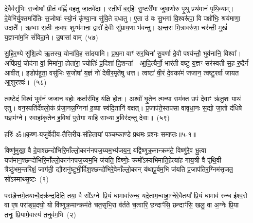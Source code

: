 दे॒वैर्वसु॑भिः स॒जोषाः᳚ प्री॒तं वह्निं॑ वहतु जा॒तवे॑दाः। स्ती॒र्णं ब॒र्॒\mbox{}हिः सु॒ष्टरी॑मा जुषा॒णोरु पृ॒थु प्रथ॑मानं पृथि॒व्याम्। दे॒वेभि॑र्यु॒क्तमदि॑तिः स॒जोषाः᳚ स्यो॒नं कृ॑ण्वा॒ना सु॑वि॒ते द॑धातु। ए॒ता उ॑ वः सु॒भगा॑ वि॒श्वरू॑पा॒ वि पक्षो॑भिः॒ श्रय॑माणा॒ उदातैः᳚। ऋ॒ष्वाः स॒तीः क॒वषः॒ शुम्भ॑माना॒ द्वारो॑ दे॒वीः सु॑प्राय॒णा भ॑वन्तु। अ॒न्त॒रा मि॒त्रावरु॑णा॒ चर॑न्ती॒ मुखं॑ य॒ज्ञाना॑म॒भि सं॑विदा॒ने। उ॒षासा॑ वाम्~(५७)

सु॒हि॒र॒ण्ये सु॑शि॒ल्पे ऋ॒तस्य॒ योना॑वि॒ह सा॑दयामि। प्र॒थ॒मा वाꣳ॑ सर॒थिना॑ सु॒वर्णा॑ दे॒वौ पश्य॑न्तौ॒ भुव॑नानि॒ विश्वा᳚। अपि॑प्रयं॒ चोद॑ना वां॒ मिमा॑ना॒ होता॑रा॒ ज्योतिः॑ प्र॒दिशा॑ दि॒शन्ता᳚। आ॒दि॒त्यैर्नो॒ भार॑ती वष्टु य॒ज्ञꣳ सर॑स्वती स॒ह रु॒द्रैर्न॑ आवीत्। इडोप॑हूता॒ वसु॑भिः स॒जोषा॑ य॒ज्ञं नो॑ देवीर॒मृते॑षु धत्त। त्वष्टा॑ वी॒रं दे॒वका॑मं जजान॒ त्वष्टु॒रर्वा॑ जायत आ॒शुरश्वः॑।~(५८)

त्वष्टे॒दं विश्वं॒ भुव॑नं जजान ब॒होः क॒र्तार॑मि॒ह य॑क्षि होतः। अश्वो॑ घृ॒तेन॒ त्मन्या॒ सम॑क्त॒ उप॑ दे॒वाꣳ ऋ॑तु॒शः पाथ॑ एतु। वन॒स्पति॑र्देवलो॒कं प्र॑जा॒नन्न॒ग्निना॑ ह॒व्या स्व॑दि॒तानि॑ वक्षत्। प्र॒जा\-प॑ते॒स्तप॑सा वावृधा॒नः स॒द्यो जा॒तो द॑धिषे य॒ज्ञम॑ग्ने। स्वाहा॑कृतेन ह॒विषा॑ पुरोगा या॒हि सा॒ध्या ह॒विर॑दन्तु दे॒वाः॥~(५९)

{\anuvakamend[{अ॒ग्निष्ट्वा॑ वा॒मश्वो॒ द्विच॑त्वारिꣳशच्च}]}%

{हरिः॑ ॐ}{॥कृष्ण-यजुर्वेदीय-तैत्तिरीय-संहितायां पञ्चम्काण्डे प्रथमः प्रश्नः समाप्तः॥५-१॥}

\setcounter{anuvakam}{0}
विष्णु॑मुखा॒ वै दे॒वाश्छन्दो॑भिरि॒माँल्लो॒कान॑नपज॒य्यम॒भ्य॑जय॒न्॒ यद्वि॑ष्णुक्र॒मान्क्रम॑ते॒ विष्णु॑रे॒व भू॒त्वा यज॑मान॒श्छन्दो॑भिरि॒माँल्लो॒कान॑नपज॒य्यम॒भि ज॑यति॒ विष्णोः॒ क्रमो᳚\-ऽस्यभिमाति॒हेत्या॑ह गाय॒त्री वै पृ॑थि॒वी त्रैष्ठु॑भम॒न्तरि॑क्षं॒ जाग॑ती॒ द्यौरानु॑ष्टुभी॒र्दिश॒श्छन्दो॑भिरे॒वेमाँल्लो॒कान् य॑थापू॒र्वम॒भि ज॑यति प्र॒जा\-प॑तिर॒ग्निम॑सृजत॒ सो᳚\-ऽस्माथ्सृ॒ष्टः~(१)

परा॑ङै॒त्तमे॒तयान्वै॒दक्र॑न्द॒दिति॒ तया॒ वै सो᳚\-ऽग्नेः प्रि॒यं धामावा॑रुन्ध॒ यदे॒ताम॒न्वाहा॒ग्नेरे॒वैतया᳚ प्रि॒यं धामाव॑ रुन्ध ईश्व॒रो वा ए॒ष परा᳚ङ्प्र॒दघो॒ यो वि॑ष्णुक्र॒मान्क्रम॑ते चत॒सृभि॒रा व॑र्तते च॒त्वारि॒ छन्दाꣳ॑सि॒ छन्दाꣳ॑सि॒ खलु॒ वा अ॒ग्नेः प्रि॒या त॒नूः प्रि॒यामे॒वास्य॑ त॒नुव॑म॒भि~(२)

